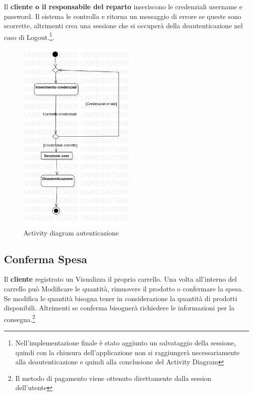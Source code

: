 \documentclass[12pt, a4paper]{report}
\begin{document}
Il \textbf{cliente o il responsabile del reparto} inseriscono le credenziali
username e password. Il sistema le controlla e ritorna un messaggio di errore
se queste sono scorrette, altrimenti crea una sessione che si occuperà della
deautenticazione nel caso di Logout.\footnote{Nell'implementazione finale è
stato aggiunto un salvataggio della sessione, quindi con la chiusura
dell'applicazione non si raggiungerà necessariamente alla deautenticazione e
quindi alla conclusione del Activity Diagram}.

\begin{figure}[h]
  \centering
  \includegraphics[width=0.52\textwidth]{Use Case Model!Autenticazione!ActivityAutenticazione!ActivityDiagramAutenticazione_8.png}
  \caption{Activity diagram autenticazione}
\end{figure}

\newpage

\subsection{Conferma Spesa}

Il \textbf{cliente} registrato un Visualizza il proprio carrello. Una volta
all'interno del carrello può Modificare le quantità, rimuovere il prodotto o
confermare la spesa. Se modifica le quantità bisogna tener in considerazione la
quantità di prodotti disponibili. Altrimenti se conferma bisognerà richiedere
le informazioni per la consegna.\footnote{Il metodo di pagamento viene
ottenuto direttamente dalla session dell'utente}
\end{document}
